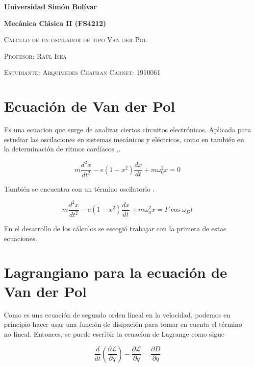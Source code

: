 \documentclass{article}
\begin{document}
		\begin{center}
		{\bfseries Universidad Sim\'on Bol\'ivar\par}
		{\bfseries Mec\'anica Cl\'asica II (FS4212)\par}
		\vspace{0.5cm}
		{\scshape\Huge Calculo de un oscilador de tipo Van der Pol \par} %
		\vspace{0.5cm}
		{\scshape\large Profesor: Ra\'ul Isea \par}
		{\scshape\large Estudiante: Arquimedes Chauran \qquad Carnet: 1910061 \par}
	\end{center}
	
	\section{Ecuaci\'on de Van der Pol}
	
	Es una ecuacion que surge de analizar ciertos circuitos electrónicos. Aplicada para estudiar las oscilaciones en sistemas mecánicos y eléctricos, como en también en la determinación de ritmos cardíacos \autocite{goldstein2014},\autocite{ku}.
	
	\begin{equation*}
		m\frac{d^2x}{dt^2}-e(1-x^2)\frac{dx}{dt}+m\omega_0^2x=0
	\end{equation*}
	
	Tambi\'en se encuentra con un t\'ermino oscilatorio \autocite{goldstein2014}.
	
	\begin{equation*}
		m\frac{d^2x}{dt^2}-e(1-x^2)\frac{dx}{dt}+m\omega_0^2x=F\cos\omega_Dt
	\end{equation*}
	
	En el desarrollo de los cálculos se escogi\'o trabajar con la primera de estas ecuaciones.
	
	\section{Lagrangiano para la ecuaci\'on de Van der Pol}
	
	Como es una ecuaci\'on de segundo orden lineal en la velocidad, podemos en principio hacer usar una funci\'on de disipaci\'on para tomar en cuenta el t\'ermino no lineal. Entonces, se puede escribir la ecuacion de Lagrange como sigue \autocite{greiner2010}
	
	\begin{equation*}
		\frac{d}{dt}\left(\frac{\partial \mathcal{L}}{\partial \dot{q}}\right)-\frac{\partial \mathcal{L}}{\partial q}=\frac{\partial D}{\partial \dot{q}}
	\end{equation*}
	
\end{document}
